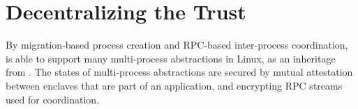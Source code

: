 \section{Decentralizing the Trust}

By migration-based process creation and
RPC-based inter-process coordination,
\sysname{} is able to support many multi-process abstractions in Linux,
as an inheritage from \graphene{}.
The states of multi-process abstractions are secured
by mutual attestation between enclaves that are part of an application,
and encrypting RPC streams used for coordination.


